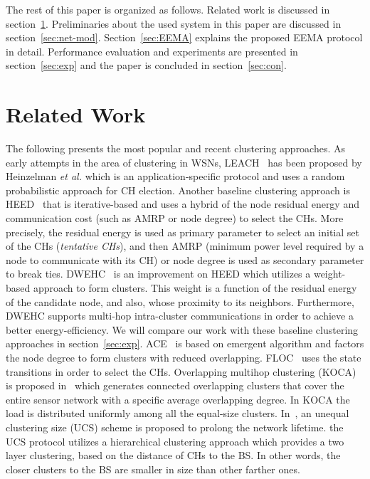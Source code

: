 \documentclass[journal]{IEEEtran}
\begin{document}
The rest of this paper is organized as follows. Related work is discussed in section~\ref{sec:re-wo}.  Preliminaries about the used system in this paper are discussed in section~\ref{sec:net-mod}.  Section~\ref{sec:EEMA} explains the proposed EEMA protocol in detail. Performance evaluation and experiments are presented in section~\ref{sec:exp} and the paper is concluded in section~\ref{sec:con}.

 
 
\section{Related Work}
\label{sec:re-wo}
The following presents the most popular and recent clustering approaches.  As early attempts in the area of clustering in WSNs, LEACH~\cite{Heinzelman2002} has been proposed by Heinzelman {\it et al.} which is an application-specific protocol and uses a random probabilistic approach for CH election.  Another baseline clustering approach is HEED~\cite{Younis2004} that is iterative-based and uses a hybrid of the node residual energy and communication cost (such as AMRP or node degree) to select the CHs. More precisely, the residual energy is used as primary parameter to select an initial set of the CHs ({\it tentative CHs}), and then AMRP (minimum power level required by a node to communicate with its CH) or node degree is used as secondary parameter to break ties.  DWEHC~\cite{Ding2005} is an improvement on HEED which utilizes a weight-based approach to form clusters.  This weight is a function of the residual energy of the  candidate node, and also, whose proximity to its neighbors.  Furthermore, DWEHC supports multi-hop intra-cluster communications in order to achieve a better energy-efficiency.
 We will compare our work with these baseline clustering approaches in section~\ref{sec:exp}.  ACE~\cite{ACE} is based on emergent algorithm and factors the node degree to form clusters with reduced overlapping.  FLOC~\cite{FLOC} uses the state transitions in order to select the CHs.   Overlapping multihop clustering (KOCA) is proposed in~\cite{koca2009} which generates connected overlapping clusters that cover the entire sensor network with a specific average overlapping degree.  
In KOCA the load is distributed uniformly among all the equal-size clusters. 
In~\cite{soro2005}, an unequal clustering size (UCS) scheme is proposed to prolong the network lifetime.  the UCS protocol utilizes a hierarchical clustering approach which provides a two layer clustering, based on the distance of CHs to the BS. In other words, the closer clusters to the BS are smaller in size than other farther ones.  
\end{document}
